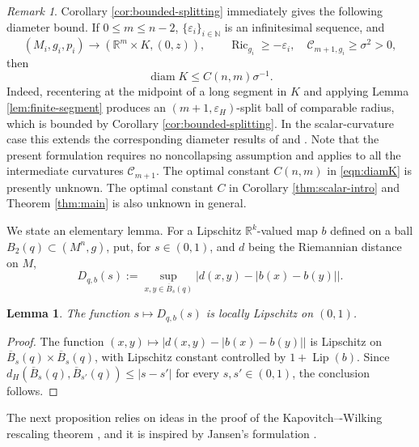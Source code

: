 \documentclass[11pt]{amsart}
\newtheorem{lemma}[theorem]{Lemma}
\theoremstyle{definition}
\theoremstyle{remark}
\newtheorem{remark}[theorem]{Remark}
\DeclareMathOperator{\Ric}{Ric}
\DeclareMathOperator{\diam}{diam}
\newcommand{\R}{\mathbb R}
\newcommand{\eps}{\varepsilon}
\begin{document}
\begin{remark}
    Corollary \ref{cor:bounded-splitting} immediately gives
the following diameter bound. If $0\leq m\leq n-2$, $\{\varepsilon_i\}_{i\in\mathbb N}$ is an infinitesimal sequence, and
\[
 (M_i,g_i,p_i)\longrightarrow(\R^m\times K,(0,z)),
 \qquad
 \Ric_{g_i}\geq -\varepsilon_i,\quad
 \mathcal{C}_{m+1,g_i}\geq\sigma^2>0,
\]
then
\begin{equation}\label{eqn:diamK}
                         \diam K\leq C(n,m)\sigma^{-1}.
\end{equation}
Indeed, recentering at the midpoint of a long segment in $K$ and
applying Lemma \ref{lem:finite-segment} produces an
$(m+1,\eps_H)$-split ball of comparable radius, which is bounded by
Corollary \ref{cor:bounded-splitting}. In the scalar-curvature case this
extends the corresponding diameter results of
\cite{BZhuXZhu} and
\cite[Theorem~1.1]{WangXieZhuZhu}. Note that the present formulation
requires no noncollapsing assumption and applies to all the
intermediate curvatures $\mathcal{C}_{m+1}$. The optimal constant $C(n,m)$ in \eqref{eqn:diamK} is presently unknown. The optimal constant $C$ in Corollary \ref{thm:scalar-intro} and Theorem \ref{thm:main} is also unknown in general.
\end{remark}

We state an elementary lemma. For a Lipschitz $\mathbb R^k$-valued map $b$ defined on a ball $B_2(q)\subset (M^n,g)$, put, for $s\in (0,1)$, and $d$ being the Riemannian distance on $M$,
\begin{equation}\label{eqn:Dqbs}
 D_{q,b}(s):=\sup_{x,y\in\overline B_s(q)}
       \bigl|d(x,y)-|b(x)-b(y)|\bigr|.
\end{equation}

\begin{lemma}\label{lem:distortion-continuity}
The function $s\mapsto D_{q,b}(s)$ is locally Lipschitz on $(0,1)$.
\end{lemma}

\begin{proof}
The function
$(x,y)\mapsto|d(x,y)-|b(x)-b(y)||$ is Lipschitz on $\overline B_s(q)\times \overline B_s(q)$, with Lipschitz constant
controlled by $1+\operatorname{Lip}(b)$.  Since
$d_H(\overline B_s(q),\overline B_{s'}(q))\leq|s-s'|$ for every $s,s'\in (0,1)$, the conclusion
follows.
\end{proof}

The next proposition relies on ideas in the proof of the Kapovitch–-Wilking rescaling theorem \cite[Theorem 5.1]{KapovitchWilking}, and it is inspired by Jansen’s formulation
\cite[Lemma 2.12]{Jansen}. 
\end{document}
